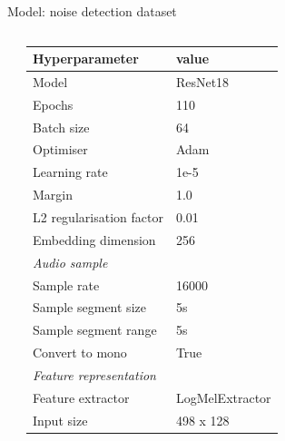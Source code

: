 \documentclass[aspectratio=169, professionalfonts]{beamer}
\begin{document}
\begin{frame}{Model: noise detection dataset}
\begin{columns}
        \begin{table}[htbp]
            \centering
        	\label{tab:Hyperparameters-DCASE}
        	\tiny
            \begin{tabular}{l|l}
                \toprule
                \textbf{Hyperparameter} & \textbf{value} \\ 
                \midrule[1pt]
                Model & ResNet18 \\ 
                \hline
                Epochs & 110 \\ 
                \hline
                Batch size & 64 \\ 
                \hline
                Optimiser & Adam \\ 
                \hline
                Learning rate & 1e-5 \\
                \hline
                Margin & 1.0 \\
                \hline
                L2 regularisation factor & 0.01 \\
                \hline
                Embedding dimension & 256 \\
                \midrule[1pt]
                \multicolumn{2}{l}{\textit{Audio sample}} \\
                \midrule[1pt]
                Sample rate & 16000 \\ 
                \hline
                Sample segment size & 5s \\
                \hline
                Sample segment range & 5s \\
                \hline
                Convert to mono & True \\
                \midrule[1pt]
                \multicolumn{2}{l}{\textit{Feature representation}} \\
                \midrule[1pt]
                Feature extractor & LogMelExtractor \\ 
                \hline
                Input size & 498 x 128 \\
                \bottomrule
            \end{tabular}
        \end{table}
    \end{columns}
    
\end{frame}
\end{document}
